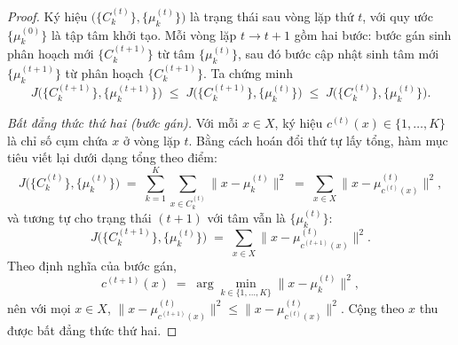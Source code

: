 \begin{proof}
Ký hiệu $\bigl(\{C_k^{(t)}\}, \{\mu_k^{(t)}\}\bigr)$ là trạng thái sau vòng lặp thứ $t$, với quy ước $\{\mu_k^{(0)}\}$ là tập tâm khởi tạo. Mỗi vòng lặp $t \to t+1$ gồm hai bước: bước gán sinh phân hoạch mới $\{C_k^{(t+1)}\}$ từ tâm $\{\mu_k^{(t)}\}$, sau đó bước cập nhật sinh tâm mới $\{\mu_k^{(t+1)}\}$ từ phân hoạch $\{C_k^{(t+1)}\}$. Ta chứng minh
\[
    J\bigl(\{C_k^{(t+1)}\}, \{\mu_k^{(t+1)}\}\bigr) \;\leq\; J\bigl(\{C_k^{(t+1)}\}, \{\mu_k^{(t)}\}\bigr) \;\leq\; J\bigl(\{C_k^{(t)}\}, \{\mu_k^{(t)}\}\bigr).
\]

\emph{Bất đẳng thức thứ hai (bước gán).} Với mỗi $x \in X$, ký hiệu $c^{(t)}(x) \in \{1, \ldots, K\}$ là chỉ số cụm chứa $x$ ở vòng lặp $t$. Bằng cách hoán đổi thứ tự lấy tổng, hàm mục tiêu viết lại dưới dạng tổng theo điểm:
\[
    J\bigl(\{C_k^{(t)}\}, \{\mu_k^{(t)}\}\bigr) \;=\; \sum_{k=1}^K \sum_{x \in C_k^{(t)}} \|x - \mu_k^{(t)}\|^2 \;=\; \sum_{x \in X} \|x - \mu_{c^{(t)}(x)}^{(t)}\|^2,
\]
và tương tự cho trạng thái $(t+1)$ với tâm vẫn là $\{\mu_k^{(t)}\}$:
\[
    J\bigl(\{C_k^{(t+1)}\}, \{\mu_k^{(t)}\}\bigr) \;=\; \sum_{x \in X} \|x - \mu_{c^{(t+1)}(x)}^{(t)}\|^2.
\]
Theo định nghĩa của bước gán,
\[
    c^{(t+1)}(x) \;=\; \arg\min_{k \in \{1, \ldots, K\}} \|x - \mu_k^{(t)}\|^2,
\]
nên với mọi $x \in X$, $\|x - \mu_{c^{(t+1)}(x)}^{(t)}\|^2 \leq \|x - \mu_{c^{(t)}(x)}^{(t)}\|^2$. Cộng theo $x$ thu được bất đẳng thức thứ hai.


\end{proof}
